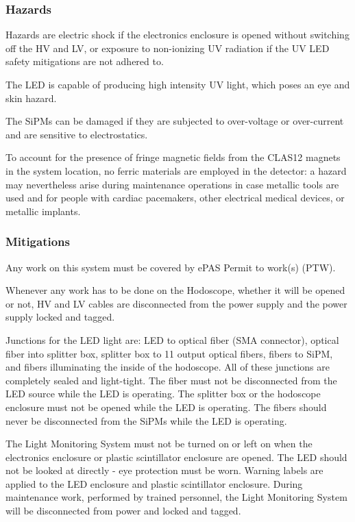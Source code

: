\subsubsection{Hazards} 

Hazards are electric shock if the electronics enclosure is opened without switching off the 
HV and LV, or exposure to non-ionizing UV radiation if the UV LED safety mitigations are not 
adhered to.

The LED is capable of producing high intensity UV light, which poses an eye and skin hazard. 

The SiPMs can be damaged if they are subjected to over-voltage or over-current and are sensitive 
to electrostatics.

To account for the presence of fringe magnetic fields from the CLAS12 magnets in the system 
location, no ferric materials are employed in the detector: a hazard may nevertheless arise 
during maintenance operations in case metallic tools are used and for people with cardiac 
pacemakers, other electrical medical devices, or metallic implants.

\subsubsection{Mitigations}
Any work on this system must be covered by ePAS Permit to work(s) (PTW).

Whenever any work has to be done on the Hodoscope, whether it will be opened or not, HV and 
LV cables are disconnected from the power supply and the power supply locked and tagged.

Junctions for the LED light are: LED to optical fiber (SMA connector), optical fiber into 
splitter box, splitter box to 11 output optical fibers, fibers to SiPM, and fibers illuminating 
the inside of the hodoscope. All of these junctions are completely sealed and light-tight. The 
fiber must not be disconnected from the LED source while the LED is operating. The splitter box 
or the hodoscope enclosure must not be opened while the LED is operating. The fibers should 
never be disconnected from the SiPMs while the LED is operating. 

The Light Monitoring System must not be turned on or left on when the electronics enclosure 
or plastic scintillator enclosure are opened. The LED should not be looked at directly - eye 
protection must be worn. Warning labels are applied to the LED enclosure and plastic 
scintillator enclosure.  During maintenance work, performed by trained personnel, the Light 
Monitoring System will be disconnected from power and locked and tagged.

